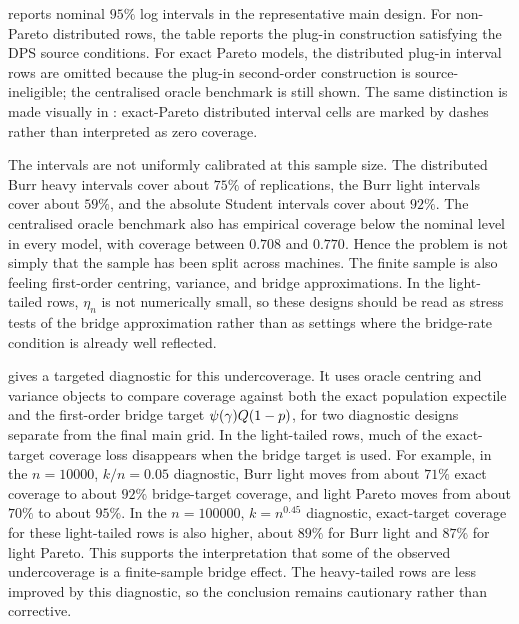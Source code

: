  reports nominal \(95\%\) log intervals in the
representative main design. For non-Pareto distributed rows, the table reports
the plug-in construction satisfying the DPS source conditions. For exact Pareto
models, the distributed plug-in interval rows are omitted because the plug-in
second-order construction is source-ineligible; the centralised oracle benchmark
is still shown. The same distinction is made visually in
: exact-Pareto distributed interval cells are
marked by dashes rather than interpreted as zero coverage.

The intervals are not uniformly calibrated at this sample size. The
distributed Burr heavy intervals cover about \(75\%\) of replications, the
Burr light intervals cover about \(59\%\), and the absolute Student intervals
cover about \(92\%\). The centralised oracle benchmark also has empirical
coverage below the nominal level in every model, with coverage between
\(0.708\) and \(0.770\). Hence the problem
is not simply that the sample has been split across machines. The finite
sample is also feeling first-order centring, variance, and bridge
approximations.
In the light-tailed rows, \(\eta_n\) is not numerically small, so these designs
should be read as stress tests of the bridge approximation rather than as
settings where the bridge-rate condition is already well reflected.

 gives a targeted diagnostic for this
undercoverage. It uses oracle centring and variance objects to compare coverage
against both the exact population expectile and the first-order bridge target
\(\psi(\gamma)Q(1-p)\), for two diagnostic designs separate from the final
main grid. In the light-tailed rows, much of the exact-target coverage loss
disappears when the bridge target is used. For example, in the \(n=10000\),
\(k/n=0.05\) diagnostic, Burr light moves from about \(71\%\) exact coverage to
about \(92\%\) bridge-target coverage, and light Pareto moves from about
\(70\%\) to about \(95\%\). In the \(n=100000\), \(k=n^{0.45}\) diagnostic,
exact-target coverage for these light-tailed rows is also higher, about
\(89\%\) for Burr light and \(87\%\) for light Pareto. This supports the
interpretation that some of the observed undercoverage is a finite-sample
bridge effect. The heavy-tailed rows are less improved by this diagnostic, so
the conclusion remains cautionary rather than corrective.


